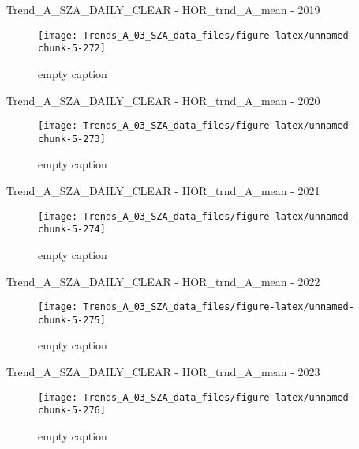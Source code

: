 \documentclass[
  10pt,
  a4paper,oneside]{article}
\begin{document}
Trend\_A\_SZA\_DAILY\_CLEAR - HOR\_trnd\_A\_mean - 2019

\begin{figure}[!ht]

{\centering \texttt{[image: Trends\_A\_03\_SZA\_data\_files/figure-latex/unnamed-chunk-5-272]} 

}

\caption{ empty caption }\label{fig:unnamed-chunk-5-272}
\end{figure}

Trend\_A\_SZA\_DAILY\_CLEAR - HOR\_trnd\_A\_mean - 2020

\begin{figure}[!ht]

{\centering \texttt{[image: Trends\_A\_03\_SZA\_data\_files/figure-latex/unnamed-chunk-5-273]} 

}

\caption{ empty caption }\label{fig:unnamed-chunk-5-273}
\end{figure}

Trend\_A\_SZA\_DAILY\_CLEAR - HOR\_trnd\_A\_mean - 2021

\begin{figure}[!ht]

{\centering \texttt{[image: Trends\_A\_03\_SZA\_data\_files/figure-latex/unnamed-chunk-5-274]} 

}

\caption{ empty caption }\label{fig:unnamed-chunk-5-274}
\end{figure}

Trend\_A\_SZA\_DAILY\_CLEAR - HOR\_trnd\_A\_mean - 2022

\begin{figure}[!ht]

{\centering \texttt{[image: Trends\_A\_03\_SZA\_data\_files/figure-latex/unnamed-chunk-5-275]} 

}

\caption{ empty caption }\label{fig:unnamed-chunk-5-275}
\end{figure}

Trend\_A\_SZA\_DAILY\_CLEAR - HOR\_trnd\_A\_mean - 2023

\begin{figure}[!ht]

{\centering \texttt{[image: Trends\_A\_03\_SZA\_data\_files/figure-latex/unnamed-chunk-5-276]} 

}

\caption{ empty caption }\label{fig:unnamed-chunk-5-276}
\end{figure}
\end{document}

